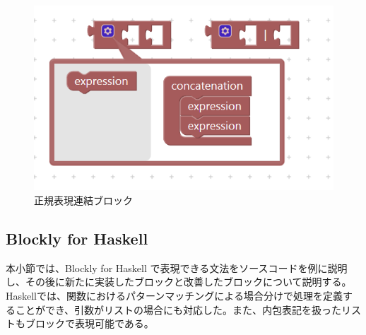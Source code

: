 \documentclass{risepaper}
\begin{document}
\begin{itemize}
\begin{figure}[h]
\begin{center}
\includegraphics[scale=0.8]{img/flex_connection_block.png}
\caption{正規表現連結ブロック}%
\label{fig:flex_connection_block}
\end{center}%
\end{figure}%

\end{itemize} 

   \subsection{Blockly for Haskell}

本小節では、Blockly for Haskell で表現できる文法をソースコードを例に説明し、その後に新たに実装したブロックと改善したブロックについて説明する。Haskellでは、関数におけるパターンマッチングによる場合分けで処理を定義することができ、引数がリストの場合にも対応した。また、内包表記を扱ったリストもブロックで表現可能である。
\end{document}
